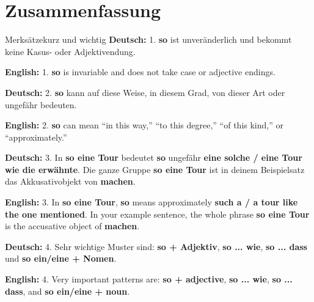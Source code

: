 \documentclass[a4paper,11pt]{article}
\newcommand{\GermanText}[1]{\textbf{Deutsch: }#1\par}
\newcommand{\EnglishText}[1]{{\small\color{SoftGray}\textbf{English: }#1\par}}
\begin{document}
    \section{Zusammenfassung}

        \begin{grammarentry}{Merksätze}{kurz und wichtig}
            \GermanText{1. \textbf{so} ist unveränderlich und bekommt keine Kasus- oder Adjektivendung.}
            \EnglishText{1. \textbf{so} is invariable and does not take case or adjective endings.}

            \GermanText{2. \textbf{so} kann \glqq auf diese Weise\grqq, \glqq in diesem Grad\grqq, \glqq von dieser Art\grqq{} oder \glqq ungefähr\grqq{} bedeuten.}
            \EnglishText{2. \textbf{so} can mean ``in this way,'' ``to this degree,'' ``of this kind,'' or ``approximately.''}

            \GermanText{3. In \textbf{so eine Tour} bedeutet \textbf{so} ungefähr \textbf{eine solche / eine Tour wie die erwähnte}. Die ganze Gruppe \textbf{so eine Tour} ist in deinem Beispielsatz das Akkusativobjekt von \textbf{machen}.}
            \EnglishText{3. In \textbf{so eine Tour}, \textbf{so} means approximately \textbf{such a / a tour like the one mentioned}. In your example sentence, the whole phrase \textbf{so eine Tour} is the accusative object of \textbf{machen}.}

            \GermanText{4. Sehr wichtige Muster sind: \textbf{so + Adjektiv}, \textbf{so ... wie}, \textbf{so ... dass} und \textbf{so ein/eine + Nomen}.}
            \EnglishText{4. Very important patterns are: \textbf{so + adjective}, \textbf{so ... wie}, \textbf{so ... dass}, and \textbf{so ein/eine + noun}.}
        \end{grammarentry}
\end{document}
